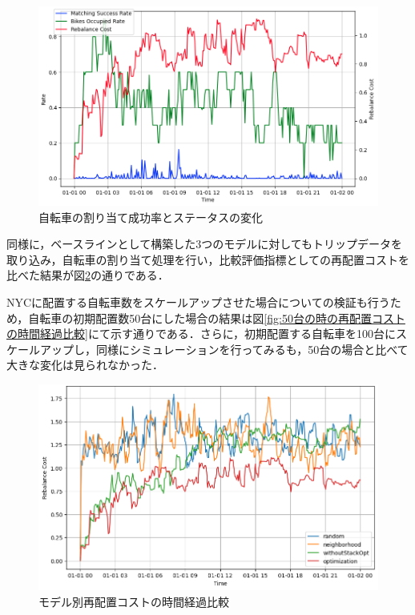 \documentclass[a4j, 10pt, twocolumn]{ltjarticle}  %
\begin{document}
        \begin{figure}[b]
          \centering
          \vspace{-5mm}  %
          \includegraphics[scale=0.25]
          {figures/dispatchedResultFor1Day.png}
          \vspace{-5mm}
          \caption{自転車の割り当て成功率とステータスの変化}
          \label{fig:resultFig}
          \vspace{-5mm}  %
        \end{figure}

        \par 同様に，ベースラインとして構築した3つのモデルに対してもトリップデータを取り込み，自転車の割り当て処理を行い，比較評価指標としての再配置コストを比べた結果が図\ref{fig:モデル別再配置コストの時間経過比較}の通りである．
        \par NYCに配置する自転車数をスケールアップさせた場合についての検証も行うため，自転車の初期配置数50台にした場合の結果は図\ref{fig:50台の時の再配置コストの時間経過比較}にて示す通りである．さらに，初期配置する自転車を100台にスケールアップし，同様にシミュレーションを行ってみるも，50台の場合と比べて大きな変化は見られなかった．

        \begin{figure}[b]
          \centering
          \includegraphics[scale=0.36]
          {figures/CompareRebalanceCost.png}
          \caption{モデル別再配置コストの時間経過比較}
          \label{fig:モデル別再配置コストの時間経過比較}
        \end{figure}
\end{document}
